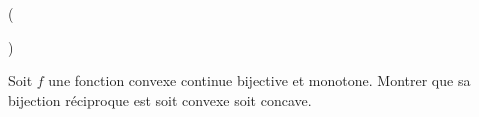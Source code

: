 \begin{tiny}()\end{tiny} Soit $f$ une fonction convexe continue bijective et monotone. Montrer que sa bijection réciproque est soit convexe soit concave.
